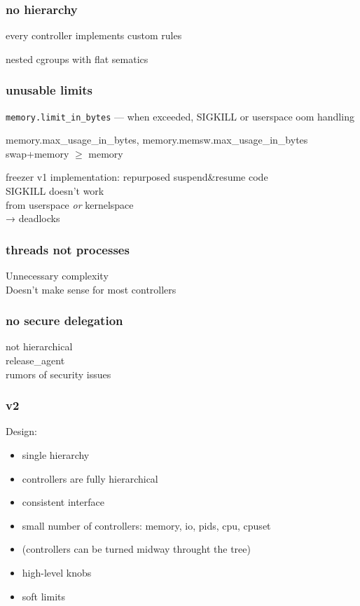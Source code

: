 \documentclass[serif]{beamer}
\begin{document}
\begin{frame}
  \frametitle{no hierarchy}

  every controller implements custom rules

  nested cgroups with flat sematics
\end{frame}

\begin{frame}
  \frametitle{unusable limits}

  \texttt{memory.limit\_in\_bytes} — when exceeded, SIGKILL or userspace oom handling
  \pause

  \medskip
  memory.max\_usage\_in\_bytes, memory.memsw.max\_usage\_in\_bytes\\
  swap+memory $\ge$ memory

  \pause

  \medskip
  freezer v1 implementation: repurposed suspend\&resume code\\
  \phantom{freezer v1 implementation:} SIGKILL doesn't work\\
  \phantom{freezer v1 implementation:} from userspace \textit{or} kernelspace\\
  \phantom{freezer v1 implementation:} → deadlocks\\
\end{frame}

\begin{frame}
  \frametitle{threads not processes}

  Unnecessary complexity\\
  Doesn't make sense for most controllers
\end{frame}

\begin{frame}
  \frametitle{no secure delegation}

  not hierarchical\\\pause
  release\_agent\\\pause
  rumors of security issues
\end{frame}

\begin{frame}
  \frametitle{v2}

  Design:
  \begin{itemize}
  \item single hierarchy
  \item controllers are fully hierarchical
  \item consistent interface
  \item small number of controllers: memory, io, pids, cpu, cpuset
  \item (controllers can be turned midway throught the tree)
  \item high-level knobs
  \item soft limits
  \end{itemize}
\end{frame}
\end{document}
